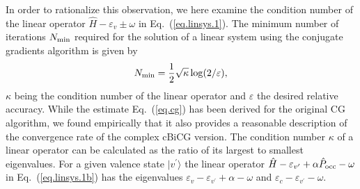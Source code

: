 \documentclass[twocolumn,prb,showpacs,superscriptaddress]{revtex4}
\def\w{\omega}
\def\>{\rangle}
\def\<{\langle}
\def\H{\hat{H}}
\def\P{\hat{P}_{\rm occ}}
\def\E{\varepsilon}
\def\vp{{v^\prime}}
\begin{document}
In order to rationalize this observation, we here examine
the condition number of the linear operator $\H-\E_v\pm\w$ in Eq.\ (\ref{eq.linsys.1}).
The minimum number of iterations $N_{\rm min}$ required for the solution of
a linear system using the conjugate gradients algorithm is given by
  \begin{equation}\label{eq.cg}
  N_{\rm min} = \frac{1}{2}\sqrt{\kappa} \log(2/\varepsilon),
  \end{equation}
$\kappa$ being the condition number of the linear operator and $\varepsilon$ the
desired relative accuracy.\cite{painless.cg} 
While the estimate Eq.\ (\ref{eq.cg}) has
been derived for the original CG algorithm, we found empirically that it also 
provides a reasonable description of the convergence rate of the complex cBiCG version.
%
The condition number $\kappa$ of a linear operator can be calculated as the ratio 
of its largest to smallest eigenvalues.
For a given valence state 
$|v^\prime\>$ the linear operator $\H - \E_\vp + \alpha \P - \w$ 
in Eq.\ (\ref{eq.linsys.1b}) has the eigenvalues
$\E_v - \E_\vp + \alpha - \w$ and $\E_c - \E_\vp - \w$. 
\end{document}
